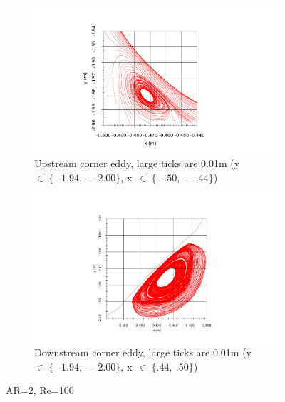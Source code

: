 \documentclass[twocolumn,10pt]{asme2ej}
\begin{document}
\begin{figure}[tbh]
        \begin{subfigure}[b]{0.22\textwidth}
                \includegraphics[width=\textwidth]{figure/leftVortex.pdf}
                \caption{Upstream corner eddy, large ticks are 0.01m (y~$\in~\{-1.94,~-2.00\}$, x~$\in~\{-.50,~-.44\}$)}
                \label{AR2RE100_upstream}
        \end{subfigure}%
        \qquad
        \begin{subfigure}[b]{0.22\textwidth}
                \includegraphics[width=\textwidth]{figure/rightVortex.pdf}
                \caption{Downstream corner eddy, large ticks are 0.01m (y~$\in~\{-1.94,~-2.00\}$, x~$\in~\{.44,~.50\}$)}
                \label{AR2RE100_downstream}
        \end{subfigure}
        \caption{AR=2, Re=100}
        \label{AR2RE100}
\end{figure}
\end{document}
